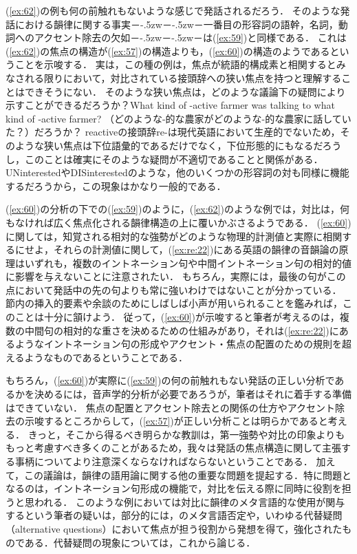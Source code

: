 \documentclass{goken}
\newcommand{\term}[2]{\textsf{#1}（#2）}
\def\ddash{－\kern-.5zw－\kern-.5zw－}
\newcommand{\ori}[1]{\noindent\textcolor[gray]{0.7}{\fontsize{8pt}{8pt}\selectfont{\textsf{(p.~#1)}}} }
\begin{document}
\noindent
(\ref{ex:62})の例も何の前触れもないような感じで発話されるだろう．
そのような発話における韻律に関する事実\ddash{}一番目の形容詞の語幹，名詞，動詞へのアクセント除去の欠如\ddash{}は(\ref{ex:59})と同様である．
これは(\ref{ex:62})の焦点の構造が(\ref{ex:57})の構造よりも，(\ref{ex:60})の構造のようであるということを示唆する．
実は，この種の例は，焦点が統語的構成素と相関するとみなされる限りにおいて，対比されている接頭辞への狭い焦点を持つと理解することはできそうにない．
そのような狭い焦点は，どのような議論下の疑問により示すことができるだろうか？What kind of -active farmer was talking to what kind of -active farmer? （どのような-的な農家がどのような-的な農家に話していた？）だろうか？
reactiveの接頭辞re-は現代英語において生産的でないため，そのような狭い焦点は下位語彙的であるだけでなく，下位形態的にもなるだろうし，このことは確実にそのような疑問が不適切であることと関係がある．
UNinterestedやDISinterestedのような，他のいくつかの形容詞の対も同様に機能するだろうから，この現象はかなり一般的である．

(\ref{ex:60})の分析の下での(\ref{ex:59})のように，(\ref{ex:62})のような例では，対比は，何もなければ広く焦点化される韻律構造の上に覆いかぶさるようである．
(\ref{ex:60})に関しては，知覚される相対的な強勢がどのような物理的計測値と実際に相関するにせよ，それらの計測値に関して，(\ref{ex:re:22})にある英語の韻律の音韻論の原理はいずれも，複数のイントネーション句や中間イントネーション句の相対的値に影響を与えないことに注意されたい．
もちろん，実際には，最後の句がこの点において発話中の先の句よりも常に強いわけではないことが分かっている．
節内の挿入的要素や余談のためにしばしば小声が用いられることを鑑みれば，このことは十分に頷けよう．
従って，(\ref{ex:60})が示唆すると筆者が考えるのは，複数の中間句の相対的な重さを決めるための仕組みがあり，それは(\ref{ex:re:22})にあるようなイントネーション句の形成やアクセント・焦点の配置のための規則を超えるようなものであるということである．

もちろん，(\ref{ex:60})が実際に(\ref{ex:59})の何の前触れもない発話の正しい分析であるかを決めるには，音声学的分析が必要であろうが，筆者はそれに着手する準備はできていない．
焦点の配置とアクセント除去との関係の仕方やアクセント除去の示唆するところからして，(\ref{ex:57})が正しい分析ことは明らかであると考える．
きっと，そこから得るべき明らかな教訓は，第一強勢や対比の印象よりももっと考慮すべき多くのことがあるため，我々は発話の焦点構造に関して主張する事柄についてより注意深くならなければならないということである．
加えて，この議論は，韻律の語用論に関する他の重要な問題を提起する．特に問題となるのは，イントネーション句形成の機能で，対比を伝える際に同時に役割を担うと思われる．
\ori{57}
このような例においては対比に韻律のメタ言語的な使用が関与するという筆者の疑いは，部分的には，\citeauthor{Horn1985}のメタ言語否定や，いわゆる\term{代替疑問}{alternative questions}において焦点が担う役割から発想を得て，強化されたものである．代替疑問の現象については，これから論じる．
\end{document}

